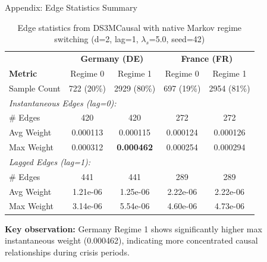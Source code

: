 \documentclass[aspectratio=169]{beamer}
\begin{document}

\begin{frame}{Appendix: Edge Statistics Summary}
\begin{table}
\centering
\scriptsize
\begin{tabular}{l|cc|cc}
\toprule
 & \multicolumn{2}{c|}{\textbf{Germany (DE)}} & \multicolumn{2}{c}{\textbf{France (FR)}} \\
\textbf{Metric} & Regime 0 & Regime 1 & Regime 0 & Regime 1 \\
\midrule
Sample Count & 722 (20\%) & 2929 (80\%) & 697 (19\%) & 2954 (81\%) \\
\midrule
\multicolumn{5}{l}{\textit{Instantaneous Edges (lag=0):}} \\
\quad \# Edges & 420 & 420 & 272 & 272 \\
\quad Avg Weight & 0.000113 & 0.000115 & 0.000124 & 0.000126 \\
\quad Max Weight & 0.000312 & \textbf{0.000462} & 0.000254 & 0.000294 \\
\midrule
\multicolumn{5}{l}{\textit{Lagged Edges (lag=1):}} \\
\quad \# Edges & 441 & 441 & 289 & 289 \\
\quad Avg Weight & 1.21e-06 & 1.25e-06 & 2.22e-06 & 2.22e-06 \\
\quad Max Weight & 3.14e-06 & 5.54e-06 & 4.60e-06 & 4.73e-06 \\
\bottomrule
\end{tabular}
\caption{Edge statistics from DS3MCausal with native Markov regime switching (d=2, lag=1, $\lambda_s$=5.0, seed=42)}
\end{table}

\vspace{0.2cm}
{\scriptsize \textbf{Key observation:} Germany Regime 1 shows significantly higher max instantaneous weight (0.000462), indicating more concentrated causal relationships during crisis periods.}
\end{frame}
\end{document}
